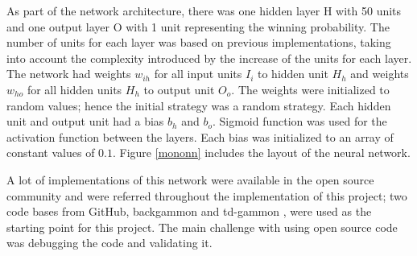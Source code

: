 \documentclass[12pt,a4paper]{article}
\begin{document}
As part of the network architecture, there was one hidden layer H with 50 units and one output layer O with 1 unit representing the winning probability. The number of units for each layer was based on previous implementations, taking into account the complexity introduced by the increase of the units for each layer. The network had weights $w_{ih}$ for all input units $I_i$ to hidden unit $H_h$ and weights $w_{ho}$ for all hidden units $H_h$ to output unit $O_o$. The weights were initialized to random values; hence the initial strategy was a random strategy. Each hidden unit and output unit had a bias $b_h$ and $b_o$. Sigmoid function was used for the activation function between the layers. Each bias was initialized to an array of constant values of $0.1$. Figure \ref{mononn} includes the layout of the neural network.

 A lot of implementations of this network were available in the open source community and were referred throughout the implementation of this project; two code bases from GitHub, backgammon \cite{awni} and td-gammon \cite{fomorians}, were used as the starting point for this project. The main challenge with using open source code was debugging the code and validating it. %
\end{document}
